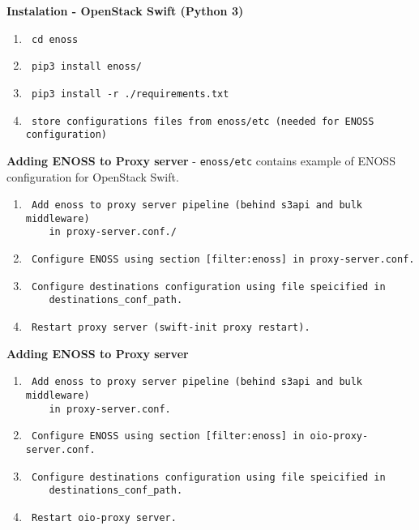 \textbf{Instalation - OpenStack Swift (Python 3)}
\begin{enumerate}
    \item \begin{verbatim} cd enoss \end{verbatim}
    \item \begin{verbatim} pip3 install enoss/\end{verbatim}
    \item \begin{verbatim} pip3 install -r ./requirements.txt\end{verbatim}
    \item \begin{verbatim} store configurations files from enoss/etc (needed for ENOSS configuration)\end{verbatim}
\end{enumerate}

\textbf{Adding ENOSS to Proxy server} - \texttt{enoss/etc} contains example of ENOSS configuration for OpenStack Swift.
\begin{enumerate}
    \item \begin{verbatim} Add enoss to proxy server pipeline (behind s3api and bulk middleware)
    in proxy-server.conf./\end{verbatim}
    \item \begin{verbatim} Configure ENOSS using section [filter:enoss] in proxy-server.conf.\end{verbatim}
    \item \begin{verbatim} Configure destinations configuration using file speicified in
    destinations_conf_path. \end{verbatim}
    \item \begin{verbatim} Restart proxy server (swift-init proxy restart).\end{verbatim}
\end{enumerate}

\textbf{Adding ENOSS to Proxy server}
\begin{enumerate}
    \item \begin{verbatim} Add enoss to proxy server pipeline (behind s3api and bulk middleware)
    in proxy-server.conf.\end{verbatim}
    \item \begin{verbatim} Configure ENOSS using section [filter:enoss] in oio-proxy-server.conf.\end{verbatim}
    \item \begin{verbatim} Configure destinations configuration using file speicified in
    destinations_conf_path. \end{verbatim}
    \item \begin{verbatim} Restart oio-proxy server.\end{verbatim}
\end{enumerate}

